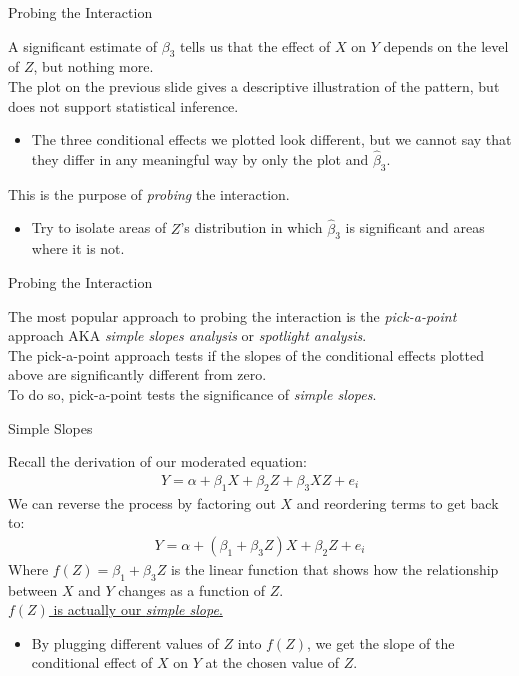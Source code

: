 \documentclass{beamer}
\newcommand{\va}[0]{\vspace{12pt}}
\newcommand{\vb}[0]{\vspace{6pt}}
\begin{document}
\begin{frame}{Probing the Interaction}

  A significant estimate of $\beta_3$ tells us that the effect of $X$
  on $Y$ depends on the level of $Z$, but nothing more.\\
  \va
  The plot on the previous slide gives a descriptive illustration of the
  pattern, but does not support statistical inference.
  \vb
  \begin{itemize}
  \item The three conditional effects we plotted look different, but
    we cannot say that they differ in any meaningful way by only the
    plot and $\hat{\beta}_3$.
  \end{itemize}
  \va
  This is the purpose of \emph{probing} the interaction.
  \vb
  \begin{itemize}
  \item Try to isolate areas of $Z$'s distribution in which
      $\hat{\beta}_3$ is significant and areas where it is not.
  \end{itemize}

\end{frame}


\begin{frame}{Probing the Interaction}

  The most popular approach to probing the interaction is the
  \emph{pick-a-point} approach AKA \emph{simple slopes analysis} or
  \emph{spotlight analysis}.\\
  \va
  The pick-a-point approach tests if the slopes of the conditional
  effects plotted above are
  significantly different from zero.\\
  \va
  To do so, pick-a-point tests the significance of \emph{simple
    slopes}.

\end{frame}


\begin{frame}{Simple Slopes}

  Recall the derivation of our moderated equation:
  \begin{align*}
    Y = \alpha + \beta_1X + \beta_2Z + \beta_3XZ + e_i
  \end{align*}
  We can reverse the process by factoring out $X$ and reordering terms
  to get back to:
  \begin{align*}
    Y = \alpha + (\beta_1 + \beta_3Z)X + \beta_2Z + e_i
  \end{align*}
  Where $f(Z) = \beta_1 + \beta_3Z$ is the linear function that shows
  how the relationship between $X$ and $Y$ changes as a function of
  $Z$.\\
  \va
  \underline{$f(Z)$ is actually our \emph{simple slope}.}
  \vb
  \begin{itemize}
  \item By plugging different values of $Z$ into $f(Z)$, we get the
    slope of the conditional effect of $X$ on $Y$ at the chosen
    value of $Z$.
  \end{itemize}

\end{frame}
\end{document}
